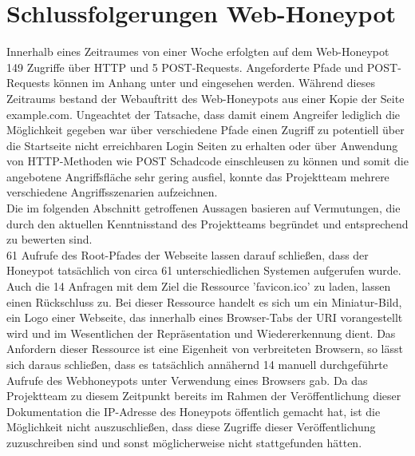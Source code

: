 \section{Schlussfolgerungen Web-Honeypot}
\label{sec:Schlussfolgerungen Web-Honeypot}

Innerhalb eines Zeitraumes von einer Woche erfolgten auf dem Web-Honeypot 149 Zugriffe über HTTP und 5 POST-Requests. Angeforderte Pfade und POST-Requests können im Anhang unter  und  eingesehen werden. Während dieses Zeitraums bestand der Webauftritt des Web-Honeypots aus einer Kopie der Seite example.com. Ungeachtet der Tatsache, dass damit einem Angreifer lediglich die Möglichkeit gegeben war über verschiedene Pfade einen Zugriff zu potentiell über die Startseite nicht erreichbaren Login Seiten zu erhalten oder über Anwendung von HTTP-Methoden wie POST Schadcode einschleusen zu können und somit die angebotene Angriffsfläche sehr gering ausfiel, konnte das Projektteam mehrere verschiedene Angriffsszenarien aufzeichnen.\\

Die im folgenden Abschnitt getroffenen Aussagen basieren auf Vermutungen, die durch den aktuellen Kenntnisstand des Projektteams begründet und entsprechend zu bewerten sind.\\

61 Aufrufe des Root-Pfades der Webseite lassen darauf schließen, dass der Honeypot tatsächlich von circa 61 unterschiedlichen Systemen aufgerufen wurde. Auch die 14 Anfragen mit dem Ziel die Ressource 'favicon.ico' zu laden, lassen einen Rückschluss zu.  Bei dieser Ressource handelt es sich um ein Miniatur-Bild, ein Logo einer Webseite, das innerhalb eines Browser-Tabs der URI vorangestellt wird und im Wesentlichen der Repräsentation und Wiedererkennung dient. Das Anfordern dieser Ressource ist eine Eigenheit von verbreiteten Browsern, so lässt sich daraus schließen, dass es tatsächlich annähernd 14 manuell durchgeführte Aufrufe des Webhoneypots unter Verwendung eines Browsers gab. Da das Projektteam zu diesem Zeitpunkt bereits im Rahmen der Veröffentlichung dieser Dokumentation die IP-Adresse des Honeypots öffentlich gemacht hat, ist die Möglichkeit nicht auszuschließen, dass diese Zugriffe dieser Veröffentlichung zuzuschreiben sind und sonst möglicherweise nicht stattgefunden hätten.\\ 

